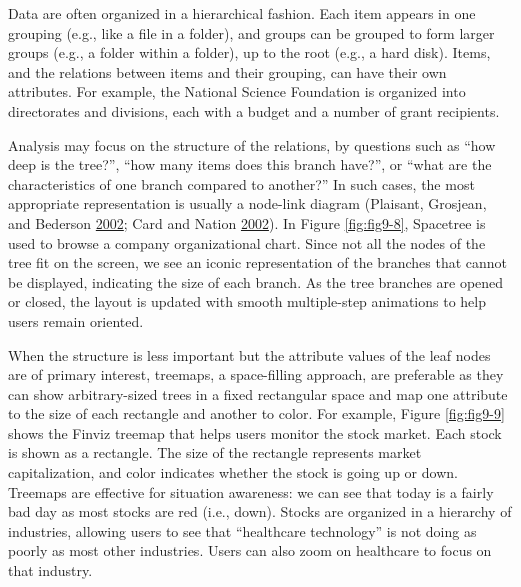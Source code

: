 \documentclass[]{krantz}
\begin{document}
Data are often organized in a hierarchical fashion. Each item appears in
one grouping (e.g., like a file in a folder), and groups can be grouped
to form larger groups (e.g., a folder within a folder), up to the root
(e.g., a hard disk). Items, and the relations between items and their
grouping, can have their own attributes. For example, the National
Science Foundation is organized into directorates and divisions, each
with a budget and a number of grant recipients.

Analysis may focus on the structure of the relations, by questions such
as ``how deep is the tree?'', ``how many items does this branch have?'',
or ``what are the characteristics of one branch compared to another?''
In such cases, the most appropriate representation is usually a
node-link diagram (Plaisant, Grosjean, and Bederson
\protect\hyperlink{ref-plaisant2002spacetree}{2002}; Card and Nation
\protect\hyperlink{ref-card2002degree}{2002}). In Figure
\ref{fig:fig9-8}, Spacetree is used to browse a company organizational
chart. Since not all the nodes of the tree fit on the screen, we see an
iconic representation of the branches that cannot be displayed,
indicating the size of each branch. As the tree branches are opened or
closed, the layout is updated with smooth multiple-step animations to
help users remain oriented.

When the structure is less important but the attribute values of the
leaf nodes are of primary interest, treemaps, a space-filling approach,
are preferable as they can show arbitrary-sized trees in a fixed
rectangular space and map one attribute to the size of each rectangle
and another to color. For example, Figure \ref{fig:fig9-9} shows the
Finviz treemap that helps users monitor the stock market. Each stock is
shown as a rectangle. The size of the rectangle represents market
capitalization, and color indicates whether the stock is going up or
down. Treemaps are effective for situation awareness: we can see that
today is a fairly bad day as most stocks are red (i.e., down). Stocks
are organized in a hierarchy of industries, allowing users to see that
``healthcare technology'' is not doing as poorly as most other
industries. Users can also zoom on healthcare to focus on that industry.
\end{document}
